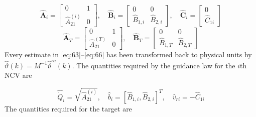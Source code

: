 \begin{equation}
\label{eq:63}
\hat{\mathbf{A}}_{i} = \left[ {\begin{array}{*{20}{c}}
  0&1 \\ 
  {\hat A_{21}^{(i)}}&0 
\end{array}} \right],\quad \hat{\mathbf{B}}_{i} = \left[ {\begin{array}{*{20}{c}}
  0&0 \\ 
  {{{\hat B}_{1,i}}}&{{{\hat B}_{2,i}}} 
\end{array}} \right],\quad \hat{\mathbf{C}}_{i} = \left[ {\begin{array}{*{20}{c}}
  0 \\ 
  {{{\hat C}_{1i}}} 
\end{array}} \right]
\end{equation}
\begin{equation}
\label{eq:64}
\hat{\mathbf{A}}_{T} = \left[ {\begin{array}{*{20}{c}}
  0&1 \\ 
  {\hat A_{21}^{(T)}}&0 
\end{array}} \right],\quad \hat{\mathbf{B}}_{T} = \left[ {\begin{array}{*{20}{c}}
  0&0 \\ 
  {{{\hat B}_{1,T}}}&{{{\hat B}_{2,T}}} 
\end{array}} \right]
\end{equation}
Every estimate in \eqref{eq:63}--\eqref{eq:66} has been transformed back to physical units by $\hat{\vartheta}(k) = {M^{ - 1}}\hat{\vartheta}^{{\text{sc}}}(k)$. The quantities required by the guidance law for the $i$th NCV are

\begin{equation}
\label{eq:65}
\hat{\dot Q}_{i} = \sqrt {\hat A_{21}^{(i)}} ,\quad \hat{b}_{i} = {\left[ {{{\hat B}_{1,i}},{{\hat B}_{2,i}}} \right]^T},\quad \hat{v}_{ri} =  - \hat{C}_{1i}
\end{equation}
The quantities required for the target are

